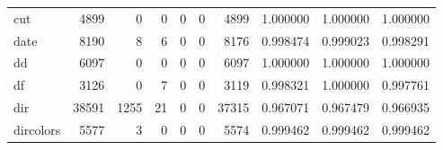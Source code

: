 \begin{tabular}{lrrrrrrrrr}
cut       &                                               4899 &                                                  0 &                                                  0 &                                                  0 &                                                  0 &                                               4899 &                                           1.000000 &                               1.000000 &                             1.000000 \\
date      &                                               8190 &                                                  8 &                                                  6 &                                                  0 &                                                  0 &                                               8176 &                                           0.998474 &                               0.999023 &                             0.998291 \\
dd        &                                               6097 &                                                  0 &                                                  0 &                                                  0 &                                                  0 &                                               6097 &                                           1.000000 &                               1.000000 &                             1.000000 \\
df        &                                               3126 &                                                  0 &                                                  7 &                                                  0 &                                                  0 &                                               3119 &                                           0.998321 &                               1.000000 &                             0.997761 \\
dir       &                                              38591 &                                               1255 &                                                 21 &                                                  0 &                                                  0 &                                              37315 &                                           0.967071 &                               0.967479 &                             0.966935 \\
dircolors &                                               5577 &                                                  3 &                                                  0 &                                                  0 &                                                  0 &                                               5574 &                                           0.999462 &                               0.999462 &                             0.999462 \\

\end{tabular}
